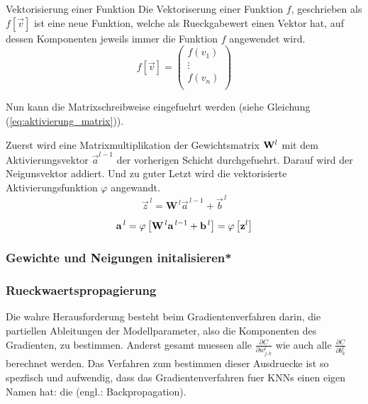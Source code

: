 \documentclass[../main]{subfiles}
\begin{document}
\begin{defbox}{Vektorisierung einer Funktion}
  Die Vektoriserung einer Funktion $f$, geschrieben als $f[\vec{v}]$ ist eine
  neue Funktion, welche als Rueckgabewert einen Vektor hat, auf dessen
  Komponenten jeweils immer die Funktion $f$ angewendet wird.
  \begin{equation*}
    f[\vec{v}]=
    \begin{pmatrix}
      f(v_1)\\
      \vdots \\
      f(v_n)\\
    \end{pmatrix}
  \end{equation*}
\end{defbox}

\para

Nun kann die Matrixschreibweise eingefuehrt werden (siehe Gleichung (\ref{eq:aktivierung_matrix})).\par
Zuerst wird eine Matrixmultiplikation der Gewichtsmatrix $\mathbf{W}^l$ mit dem
Aktivierungsvektor $\vec{a}^{l-1}$ der vorherigen Schicht durchgefuehrt. Darauf
wird der Neigunsvektor addiert. Und zu guter Letzt wird die vektorisierte
Aktivierungsfunktion $\varphi$ angewandt.
\begin{equation}\label{eq:aktivierung_matrix}
  \vec{z}^{\,l} = \mathbf{W}^{\,l} \vec{a}^{\,l-1} + \vec{b}^{\,l}
\end{equation}
\par
\begin{equation}\label{eq:aktivierung_matrix}
  \mathbf{a}^{\,l} = \varphi \left[\mathbf{W}^{\,l} \mathbf{a}^{\,l-1} + \mathbf{b}^{\,l} \right] = \varphi \left[ \mathbf{z}^l \right]
\end{equation}


\subsubsection{Gewichte und Neigungen initalisieren*}

\subsubsection{Rueckwaertspropagierung}\label{sec:backpropagation}
Die wahre Herausforderung besteht beim Gradientenverfahren darin,
die partiellen Ableitungen der Modellparameter,
also die Komponenten des Gradienten, zu bestimmen.
Anderst gesamt muessen alle
$\frac{\partial C}{\partial w_{j,k}^l}$ wie auch alle $\frac{\partial
  C}{\partial b_k^l}$
berechnet werden.
Das Verfahren zum bestimmen dieser Ausdruecke ist so spezfisch und aufwendig,
dass das Gradientenverfahren fuer KNNs einen eigen Namen hat: die
 (engl.: Backpropagation).
\end{document}
